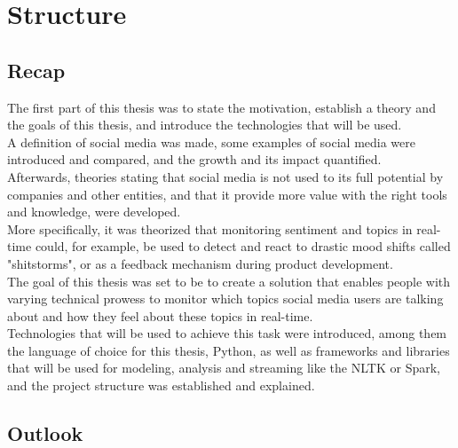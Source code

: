 
\chapter{Structure}
\label{ch:structure}

\section{Recap}
\label{sec:recap}

The first part of this thesis was to state the motivation,
establish a theory and the goals of this thesis, and introduce the technologies that will be used.\\
A definition of social media was made,
some examples of social media were introduced and compared,
and the growth and its impact quantified.\\
Afterwards, theories stating that social media is not used to its full potential by companies and other entities,
and that it provide more value with the right tools and knowledge, were developed. \\
More specifically, it was theorized that monitoring sentiment and topics in real-time could, for example,
be used to detect and react to drastic mood shifts called "shitstorms", or as a feedback mechanism during product development.\\
The goal of this thesis was set to be to create a solution that enables people with varying technical prowess to monitor
which topics social media users are talking about and how they feel about these topics in real-time.\\
Technologies that will be used to achieve this task were introduced, among them the language of choice for this thesis,
Python, as well as frameworks and libraries that will be used for modeling, analysis and streaming like the NLTK or Spark,
and the project structure was established and explained.

\section{Outlook}
\label{sec:outlook}


